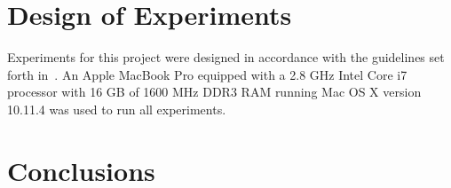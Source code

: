 \documentclass[conference]{IEEEtran}
\begin{document}
\section{Design of Experiments} \label{sec:experiment}


Experiments for this project were designed in accordance with the guidelines
set forth in~\cite{barr2001}. An Apple MacBook Pro equipped with a 2.8 GHz
Intel Core i7 processor with 16 GB of 1600 MHz DDR3 RAM running Mac OS X
version 10.11.4 was used to run all experiments.

\section{Conclusions} \label{sec:conclusion}

\end{document}
